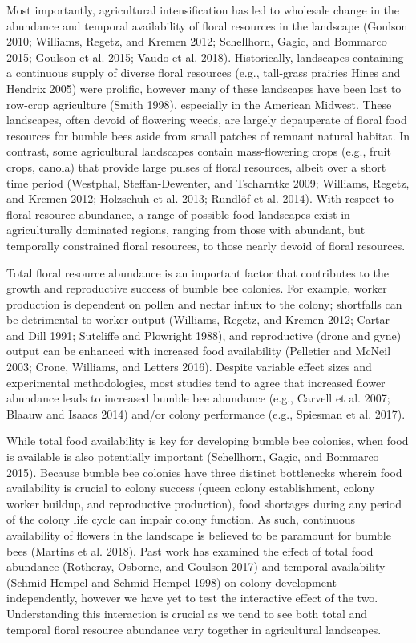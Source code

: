 \documentclass[11pt,]{article}
\begin{document}
Most importantly, agricultural intensification has led to wholesale
change in the abundance and temporal availability of floral resources in
the landscape (Goulson 2010; Williams, Regetz, and Kremen 2012;
Schellhorn, Gagic, and Bommarco 2015; Goulson et al. 2015; Vaudo et al.
2018). Historically, landscapes containing a continuous supply of
diverse floral resources (e.g., tall-grass prairies Hines and Hendrix
2005) were prolific, however many of these landscapes have been lost to
row-crop agriculture (Smith 1998), especially in the American Midwest.
These landscapes, often devoid of flowering weeds, are largely
depauperate of floral food resources for bumble bees aside from small
patches of remnant natural habitat. In contrast, some agricultural
landscapes contain mass-flowering crops (e.g., fruit crops, canola) that
provide large pulses of floral resources, albeit over a short time
period (Westphal, Steffan-Dewenter, and Tscharntke 2009; Williams,
Regetz, and Kremen 2012; Holzschuh et al. 2013; Rundlöf et al. 2014).
With respect to floral resource abundance, a range of possible food
landscapes exist in agriculturally dominated regions, ranging from those
with abundant, but temporally constrained floral resources, to those
nearly devoid of floral resources.

Total floral resource abundance is an important factor that contributes
to the growth and reproductive success of bumble bee colonies. For
example, worker production is dependent on pollen and nectar influx to
the colony; shortfalls can be detrimental to worker output (Williams,
Regetz, and Kremen 2012; Cartar and Dill 1991; Sutcliffe and Plowright
1988), and reproductive (drone and gyne) output can be enhanced with
increased food availability (Pelletier and McNeil 2003; Crone, Williams,
and Letters 2016). Despite variable effect sizes and experimental
methodologies, most studies tend to agree that increased flower
abundance leads to increased bumble bee abundance (e.g., Carvell et al.
2007; Blaauw and Isaacs 2014) and/or colony performance (e.g., Spiesman
et al. 2017).

While total food availability is key for developing bumble bee colonies,
when food is available is also potentially important (Schellhorn, Gagic,
and Bommarco 2015). Because bumble bee colonies have three distinct
bottlenecks wherein food availability is crucial to colony success
(queen colony establishment, colony worker buildup, and reproductive
production), food shortages during any period of the colony life cycle
can impair colony function. As such, continuous availability of flowers
in the landscape is believed to be paramount for bumble bees (Martins et
al. 2018). Past work has examined the effect of total food abundance
(Rotheray, Osborne, and Goulson 2017) and temporal availability
(Schmid-Hempel and Schmid-Hempel 1998) on colony development
independently, however we have yet to test the interactive effect of the
two. Understanding this interaction is crucial as we tend to see both
total and temporal floral resource abundance vary together in
agricultural landscapes.
\end{document}
